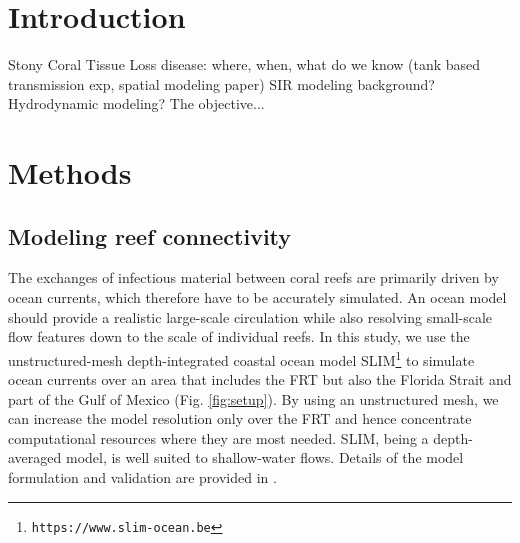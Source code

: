 \documentclass[utf8]{frontiersSCNS}
\begin{document}
\section{Introduction}
Stony Coral Tissue Loss disease: where, when, what do we know (tank based transmission exp, spatial modeling paper)
SIR modeling background?
Hydrodynamic modeling?
The objective...

\section{Methods}

\subsection{Modeling reef connectivity}
The exchanges of infectious material between coral reefs are primarily driven by ocean currents, which therefore have to be accurately simulated. An ocean model should provide a realistic large-scale circulation while also resolving small-scale flow features down to the scale of individual reefs. In this study, we use the unstructured-mesh depth-integrated coastal ocean model SLIM\footnote{{\tt https://www.slim-ocean.be}} to simulate ocean currents over an area that includes the FRT but also the Florida Strait and part of the Gulf of Mexico (Fig. \ref{fig:setup}). By using an unstructured mesh, we can increase the model resolution only over the FRT and hence concentrate computational resources where they are most needed. SLIM, being a depth-averaged model, is well suited to shallow-water flows. %
Details of the model formulation and validation are provided in \cite{frys20}. 
\end{document}
